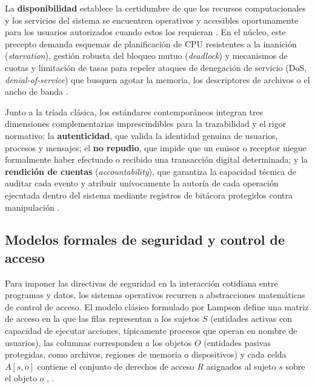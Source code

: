 \documentclass[12pt]{article}
\begin{document}
La \textbf{disponibilidad} establece la certidumbre de que los recursos computacionales y los servicios del sistema se encuentren operativos y accesibles oportunamente para los usuarios autorizados cuando estos los requieran \parencite[\S 2, p.\ 28]{rfc4949}. En el núcleo, este precepto demanda esquemas de planificación de CPU resistentes a la inanición (\textit{starvation}), gestión robusta del bloqueo mutuo (\textit{deadlock}) y mecanismos de cuotas y limitación de tasas para repeler ataques de denegación de servicio (DoS, \textit{denial-of-service}) que busquen agotar la memoria, los descriptores de archivos o el ancho de banda \parencite[\S 15.1, p.\ 510]{silberschatz2006fundamentos}.

Junto a la tríada clásica, los estándares contemporáneos integran tres dimensiones complementarias imprescindibles para la trazabilidad y el rigor normativo: la \textbf{autenticidad}, que valida la identidad genuina de usuarios, procesos y mensajes; el \textbf{no repudio}, que impide que un emisor o receptor niegue formalmente haber efectuado o recibido una transacción digital determinada; y la \textbf{rendición de cuentas} (\textit{accountability}), que garantiza la capacidad técnica de auditar cada evento y atribuir unívocamente la autoría de cada operación ejecutada dentro del sistema mediante registros de bitácora protegidos contra manipulación \parencite[\S 2.1, p.\ 6]{nistSp800_12}.

\subsection{Modelos formales de seguridad y control de acceso}\label{subsec:modelosFormalesControlAcceso}

Para imponer las directivas de seguridad en la interacción cotidiana entre programas y datos, los sistemas operativos recurren a abstracciones matemáticas de control de acceso. El modelo clásico formulado por Lampson define una matriz de acceso en la que las filas representan a los sujetos $S$ (entidades activas con capacidad de ejecutar acciones, típicamente procesos que operan en nombre de usuarios), las columnas corresponden a los objetos $O$ (entidades pasivas protegidas, como archivos, regiones de memoria o dispositivos) y cada celda $A[s, o]$ contiene el conjunto de derechos de acceso $R$ asignados al sujeto $s$ sobre el objeto $o$ \parencite[\S 14.4, p.\ 489]{silberschatz2006fundamentos}, \parencite[\S 15.3, p.\ 670]{stallings2018operating}.
\end{document}
